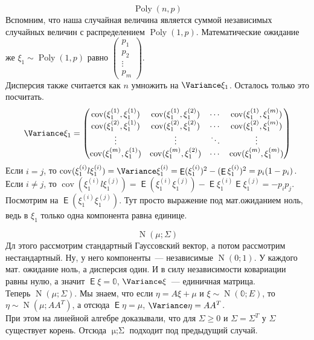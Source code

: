 \documentclass{article}
\DeclareMathOperator{\Expected}{\mathsf{E}}
\DeclareMathOperator{\Covariance}{cov}
\begin{document}
    \begin{example}
        $$\hyperref[Poly]{\operatorname{Poly}}(n,p)$$
        Вспомним, что наша случайная величина является суммой независимых случайных величин с распределением $\operatorname{Poly}(1,p)$. Математические ожидание же $\xi_1\sim\operatorname{Poly}(1,p)$ равно $\left(\begin{matrix}
            p_1\\p_2\\\vdots\\p_m
        \end{matrix}\right)$.\\
        Дисперсия также считается как $n$ умножить на $\Variance\xi_1$. Осталось только это посчитать.
        $$
        \Variance\xi_1=\left(\begin{matrix}
            \Covariance(\xi_1^{(1)},\xi_1^{(1)}) & \Covariance(\xi_1^{(1)},\xi_1^{(2)}) & \cdots & \Covariance(\xi_1^{(1)},\xi_1^{(m)})\\
            \Covariance(\xi_1^{(2)},\xi_1^{(1)}) & \Covariance(\xi_1^{(2)},\xi_1^{(2)}) & \cdots & \Covariance(\xi_1^{(2)},\xi_1^{(m)})\\
            \vdots & \vdots & \ddots & \vdots\\
            \Covariance(\xi_1^{(m)},\xi_1^{(1)}) & \Covariance(\xi_1^{(m)},\xi_1^{(2)}) & \cdots & \Covariance(\xi_1^{(m)},\xi_1^{(m)})\\
        \end{matrix}\right)
        $$
        Если $i=j$, то $\Covariance(\xi_1^{(i)}l\xi_1^{(i)})=\Variance\xi_1^{(i)}=\Expected(\xi_1^{(i)})^2-(\Expected\xi_1^{(i)})^2=p_i(1-p_i)$.\\
        Если $i\neq j$, то $\Covariance(\xi_1^{(i)}l\xi_1^{(j)})=\Expected(\xi_1^{(i)}\xi_1^{(j)})-\Expected\xi_1^{(i)}\Expected\xi_1^{(j)}=-p_ip_j$.
        Посмотрим на $\Expected(\xi_1^{(i)}\xi_1^{(j)})$. Тут просто выражение под мат.ожиданием ноль, ведь в $\xi_1$ только одна компонента равна единице.
    \end{example}
    \begin{example}
        $$\hyperref[N (многомерное)]{\operatorname{N}}(\mu;\Sigma)$$
        Дл этого рассмотрим стандартный Гауссовский вектор, а потом рассмотрим нестандартный. Ну, у него компоненты~--- независимые $\operatorname{N}(0;1)$. У каждого мат. ожидание ноль, а дисперсия один. И в силу независимости ковариации равны нулю, а значит $\Expected\xi=\mathbb0$, $\Variance\xi$~--- единичная матрица.\\
        Теперь $\operatorname{N}(\mu;\Sigma)$. Мы знаем, что если $\eta=A\xi+\mu$ и $\xi\sim\operatorname{N}(\mathbb0;E)$, то $\eta\sim\operatorname{N}(\mu;AA^T)$, а отсюда $\Expected\eta=\mu$, $\Variance\eta=AA^T$.\\
        При этом на линейной алгебре доказывали, что для $\Sigma\geqslant0$ и $\Sigma=\Sigma^T$ у $\Sigma$ существует корень. Отсюда $\operatorname{\mu;\Sigma}$ подходит под предыдущий случай.
    \end{example}
\end{document}
